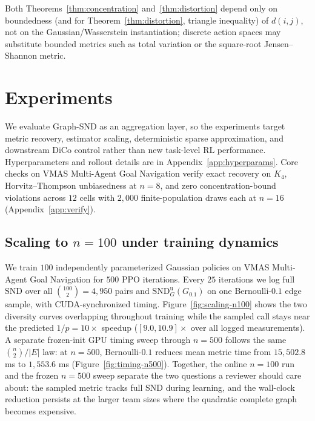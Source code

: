 \documentclass{article}
\theoremstyle{plain}
\theoremstyle{definition}
\theoremstyle{remark}
\newcommand{\SND}{\ensuremath{\mathrm{SND}}}
\newcommand{\SNDG}{\mathrm{SND}_{G}}
\begin{document}
Both Theorems~\ref{thm:concentration} and~\ref{thm:distortion} depend
only on boundedness (and for Theorem~\ref{thm:distortion}, triangle
inequality) of $d(i,j)$, not on the Gaussian/Wasserstein instantiation;
discrete action spaces may substitute bounded metrics such as total
variation or the square-root Jensen--Shannon metric.

\section{Experiments}
\label{sec:experiments}

We evaluate Graph-SND as an aggregation layer, so the experiments target
metric recovery, estimator scaling, deterministic sparse approximation,
and downstream DiCo control rather than new task-level RL performance.
Hyperparameters and rollout details are in Appendix~\ref{app:hyperparams}.
Core checks on VMAS Multi-Agent Goal Navigation verify exact recovery on $K_4$,
Horvitz--Thompson unbiasedness at $n=8$, and zero concentration-bound
violations across $12$ cells with $2{,}000$ finite-population draws each
at $n=16$
(Appendix~\ref{app:verify}).

\subsection{Scaling to $n=100$ under training dynamics}
\label{sec:experiments:scaling}

We train $100$ independently parameterized Gaussian policies on VMAS
Multi-Agent Goal Navigation for $500$ PPO iterations. Every $25$ iterations we log
full $\SND$ over all $\binom{100}{2}=4{,}950$ pairs and
$\SNDG^{\mathrm{u}}(G_{0.1})$ on one Bernoulli-$0.1$ edge sample, with
CUDA-synchronized timing. Figure~\ref{fig:scaling-n100} shows the two
diversity curves overlapping throughout training while the sampled call
stays near the predicted $1/p=10\times$ speedup
($[9.0,10.9]\times$ over all logged measurements). A separate frozen-init
GPU timing sweep through $n=500$ follows the same
$\binom{n}{2}/|E|$ law: at $n=500$, Bernoulli-$0.1$ reduces mean metric
time from $15{,}502.8$ ms to $1{,}553.6$ ms
(Figure~\ref{fig:timing-n500}). Together, the online $n=100$ run and
the frozen $n=500$ sweep separate the two questions a reviewer should
care about: the sampled metric tracks full SND during learning, and the
wall-clock reduction persists at the larger team sizes where the
quadratic complete graph becomes expensive.
\end{document}
